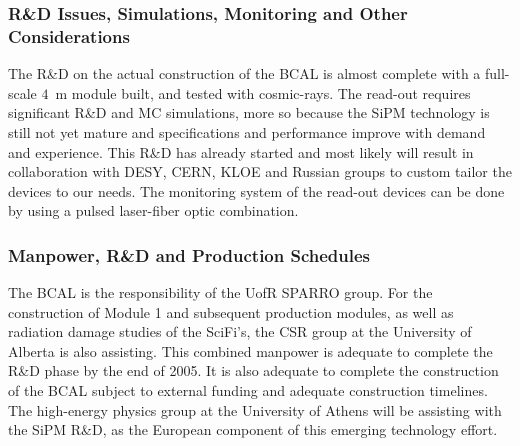\subsubsection*{R\&D Issues, Simulations, Monitoring and Other Considerations}
The R\&D on the actual construction of the BCAL is almost complete with
a full-scale $4$~m module built, and tested with cosmic-rays.  The
read-out requires significant R\&D and MC simulations, more so because the SiPM
technology is still not yet mature and specifications and performance improve
with demand and experience.  This R\&D has already started and most likely will
result in collaboration with DESY, CERN, KLOE and Russian groups to custom
tailor the devices to our needs.  The monitoring system of the read-out devices
can be done by using a pulsed laser-fiber optic combination.



\subsubsection*{Manpower, R\&D and Production Schedules}

The BCAL is the responsibility of the UofR SPARRO group.   For the construction
of Module 1 and subsequent production modules, as well as radiation damage
studies of the SciFi's, the CSR group at the University of Alberta is also
assisting.  This combined manpower is adequate to complete the R\&D phase
by the end of 2005.   It is also adequate to complete the construction of
the BCAL subject to external funding and adequate construction timelines.
The high-energy physics group at the University of Athens will be assisting
with the SiPM R\&D, as the European component of this emerging technology effort.

